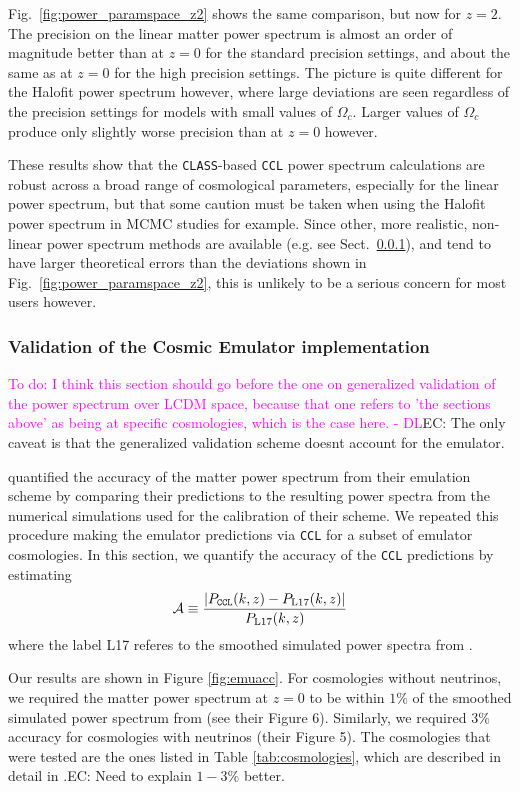 \documentclass[\docopts]{\docclass}
\newcommand{\todo}[1]{\textcolor{magenta}{To do: #1}}
\newcommand{\elisa}[1]{\textcolor{green!10!orange!90!}{EC: #1}}
\newcommand{\ccl}{{\tt CCL}\xspace}
\begin{document}
Fig.~\ref{fig:power_paramspace_z2} shows the same comparison, but now for $z=2$. The precision on the linear matter power spectrum is almost an order of magnitude better than at $z=0$ for the standard precision settings, and about the same as at $z=0$ for the high precision settings. The picture is quite different for the Halofit power spectrum however, where large deviations are seen regardless of the precision settings for models with small values of $\Omega_c$. Larger values of $\Omega_c$ produce only slightly worse precision than at $z=0$ however.

These results show that the {\tt CLASS}-based \ccl power spectrum calculations are robust across a broad range of cosmological parameters, especially for the linear power spectrum, but that some caution must be taken when using the Halofit power spectrum in MCMC studies for example. Since other, more realistic, non-linear power spectrum methods are available (e.g. see Sect.~\ref{sec:cosmicemu}), and tend to have larger theoretical errors than the deviations shown in Fig.~\ref{fig:power_paramspace_z2}, this is unlikely to be a serious concern for most users however.


\subsubsection{Validation of the Cosmic Emulator implementation}
\label{sec:cosmicemu}
\todo{I think this section should go before the one on generalized validation of the power spectrum over LCDM space, because that one refers to 'the sections above' as being at specific cosmologies, which is the case here. - DL}\elisa{The only caveat is that the generalized validation scheme doesnt account for the emulator.}

\citet{Lawrence17} quantified the accuracy of the matter power spectrum from their emulation scheme by comparing their predictions to the resulting power spectra from the numerical simulations used for the calibration of their scheme. We repeated this procedure making the emulator predictions via \ccl for a subset of emulator cosmologies. In this section, we quantify the accuracy of the \ccl predictions by estimating
\begin{equation}
  \mathcal{A}\equiv\frac{|P_{\tt CCL}(k,z)-P_{\rm L17}(k,z)|}{P_{\rm L17}(k,z)}
  \label{eq:pkaccemu}
\end{equation}
where the label L17 referes to the smoothed simulated power spectra from \citet{Lawrence17}.

Our results are shown in Figure \ref{fig:emuacc}. For cosmologies without neutrinos, we required the matter power spectrum at $z=0$ to be within $1\%$ of the smoothed simulated power spectrum from \citet{Lawrence17} (see their Figure 6). Similarly, we required $3\%$ accuracy for cosmologies with neutrinos (their Figure 5). The cosmologies that were tested are the ones listed in Table \ref{tab:cosmologies}, which are described in detail in \citet{Lawrence17}.\elisa{Need to explain $1-3\%$ better.}
\end{document}
